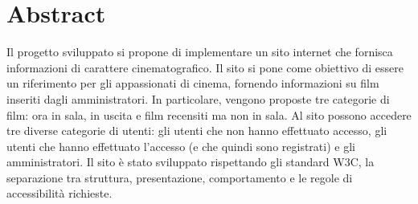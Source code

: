 \documentclass[../Relazione.tex]{subfiles}
\begin{document}
\section{Abstract}

Il progetto sviluppato si propone di implementare un sito internet che fornisca informazioni di carattere cinematografico.
Il sito si pone come obiettivo di essere un riferimento per gli appassionati di cinema, fornendo informazioni su film inseriti dagli
amministratori. In particolare, vengono proposte tre categorie di film: ora in sala, in uscita e film recensiti ma non in sala.
Al sito possono accedere tre diverse categorie di utenti: gli utenti che non hanno effettuato accesso, gli utenti che hanno effettuato l'accesso (e che quindi sono registrati) e gli amministratori.
Il sito è stato sviluppato rispettando gli standard W3C, la separazione tra struttura, presentazione, comportamento
e le regole di accessibilità richieste.
\end{document}
